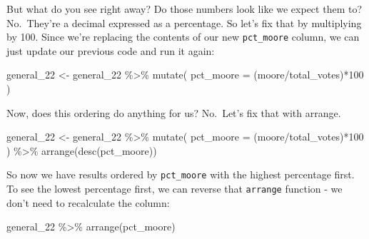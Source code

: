 \documentclass[
  letterpaper,
  DIV=11,
  numbers=noendperiod]{scrreprt}
\newenvironment{Shaded}{\begin{snugshade}}{\end{snugshade}}
\newcommand{\AttributeTok}[1]{\textcolor[rgb]{0.40,0.45,0.13}{#1}}
\newcommand{\DecValTok}[1]{\textcolor[rgb]{0.68,0.00,0.00}{#1}}
\newcommand{\FunctionTok}[1]{\textcolor[rgb]{0.28,0.35,0.67}{#1}}
\newcommand{\NormalTok}[1]{\textcolor[rgb]{0.00,0.23,0.31}{#1}}
\newcommand{\OtherTok}[1]{\textcolor[rgb]{0.00,0.23,0.31}{#1}}
\newcommand{\SpecialCharTok}[1]{\textcolor[rgb]{0.37,0.37,0.37}{#1}}
\begin{document}
But what do you see right away? Do those numbers look like we expect
them to? No.~They're a decimal expressed as a percentage. So let's fix
that by multiplying by 100. Since we're replacing the contents of our
new \texttt{pct\_moore} column, we can just update our previous code and
run it again:

\begin{Shaded}
\begin{Highlighting}[]
\NormalTok{general\_22 }\OtherTok{\textless{}{-}}\NormalTok{ general\_22 }\SpecialCharTok{\%\textgreater{}\%}
  \FunctionTok{mutate}\NormalTok{(}
    \AttributeTok{pct\_moore =}\NormalTok{ (moore}\SpecialCharTok{/}\NormalTok{total\_votes)}\SpecialCharTok{*}\DecValTok{100}
\NormalTok{  )}
\end{Highlighting}
\end{Shaded}

Now, does this ordering do anything for us? No.~Let's fix that with
arrange.

\begin{Shaded}
\begin{Highlighting}[]
\NormalTok{general\_22 }\OtherTok{\textless{}{-}}\NormalTok{ general\_22 }\SpecialCharTok{\%\textgreater{}\%}
  \FunctionTok{mutate}\NormalTok{(}
    \AttributeTok{pct\_moore =}\NormalTok{ (moore}\SpecialCharTok{/}\NormalTok{total\_votes)}\SpecialCharTok{*}\DecValTok{100}
\NormalTok{  ) }\SpecialCharTok{\%\textgreater{}\%} 
  \FunctionTok{arrange}\NormalTok{(}\FunctionTok{desc}\NormalTok{(pct\_moore))}
\end{Highlighting}
\end{Shaded}

So now we have results ordered by \texttt{pct\_moore} with the highest
percentage first. To see the lowest percentage first, we can reverse
that \texttt{arrange} function - we don't need to recalculate the
column:

\begin{Shaded}
\begin{Highlighting}[]
\NormalTok{general\_22 }\SpecialCharTok{\%\textgreater{}\%}
  \FunctionTok{arrange}\NormalTok{(pct\_moore)}
\end{Highlighting}
\end{Shaded}
\end{document}
